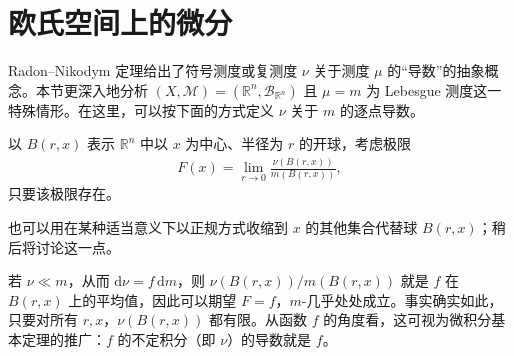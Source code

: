 \documentclass[../../main.tex]{subfiles}%
\begin{document}
\section{欧氏空间上的微分}\label{section:ch03-euclidean-differentiation}
Radon–Nikodym 定理给出了符号测度或复测度 $\nu$ 关于测度 $\mu$ 的“导数”的抽象概念。本节更深入地分析 $(X,\mathscr{M})=(\mathbb{R}^n,\mathscr{B}_{\mathbb{R}^n})$ 且 $\mu=m$ 为 Lebesgue 测度这一特殊情形。在这里，可以按下面的方式定义 $\nu$ 关于 $m$ 的逐点导数。
\begin{definition}[测度的逐点导数]\label{definition:ch03-pointwise-measure-derivative}
以 $B(r,x)$ 表示 $\mathbb{R}^n$ 中以 $x$ 为中心、半径为 $r$ 的开球，考虑极限
\begin{align*}
F(x)=\lim_{r\to0}\frac{\nu(B(r,x))}{m(B(r,x))},
\end{align*}
只要该极限存在。
\end{definition}
\begin{remark}
也可以用在某种适当意义下以正规方式收缩到 $x$ 的其他集合代替球 $B(r,x)$；稍后将讨论这一点。
\end{remark}
若 $\nu\ll m$，从而 $\mathrm{d}\nu=f\,\mathrm{d}m$，则 $\nu(B(r,x))/m(B(r,x))$ 就是 $f$ 在 $B(r,x)$ 上的平均值，因此可以期望 $F=f$，$m$-几乎处处成立。事实确实如此，只要对所有 $r,x$，$\nu(B(r,x))$ 都有限。从函数 $f$ 的角度看，这可视为微积分基本定理的推广：$f$ 的不定积分（即 $\nu$）的导数就是 $f$。
\end{document}
